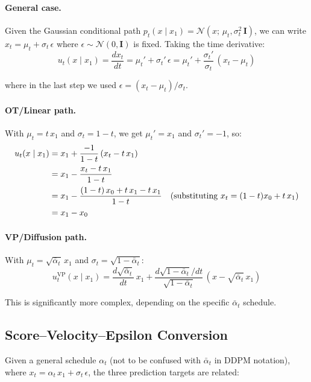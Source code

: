 \documentclass[11pt, a4paper]{article}
\newcommand{\alphabar}{\bar{\alpha}}
\newcommand{\N}{\mathcal{N}}
\newcommand{\Id}{\mathbf{I}}
\begin{document}
\paragraph{General case.}  Given the Gaussian conditional path
$p_t(x \mid x_1) = \N(x;\, \mu_t, \sigma_t^2\, \Id)$, we can write
$x_t = \mu_t + \sigma_t\, \epsilon$ where $\epsilon \sim \N(0,\Id)$ is
fixed.  Taking the time derivative:
\begin{equation}
  u_t(x \mid x_1) = \frac{dx_t}{dt}
  = \mu_t' + \sigma_t'\, \epsilon
  = \mu_t' + \frac{\sigma_t'}{\sigma_t}\,(x_t - \mu_t)
\end{equation}

where in the last step we used $\epsilon = (x_t - \mu_t)/\sigma_t$.

\paragraph{OT/Linear path.}
With $\mu_t = t\,x_1$ and $\sigma_t = 1-t$, we get
$\mu_t' = x_1$ and $\sigma_t' = -1$, so:
\begin{align}
  u_t(x \mid x_1)
  &= x_1 + \frac{-1}{1-t}\,(x_t - t\, x_1) \notag \\
  &= x_1 - \frac{x_t - t\, x_1}{1-t} \notag \\
  &= x_1 - \frac{(1-t)\,x_0 + t\,x_1 - t\,x_1}{1-t}
    \quad \text{(substituting $x_t = (1-t)x_0 + t\,x_1$)} \notag \\
  &= x_1 - x_0
\end{align}

\paragraph{VP/Diffusion path.}
With $\mu_t = \sqrt{\alphabar_t}\, x_1$ and
$\sigma_t = \sqrt{1-\alphabar_t}$:
\begin{equation}
  u_t^{\mathrm{VP}}(x \mid x_1)
  = \frac{d\sqrt{\alphabar_t}}{dt}\, x_1
  + \frac{d\sqrt{1-\alphabar_t}/dt}{\sqrt{1-\alphabar_t}}
    \,(x - \sqrt{\alphabar_t}\, x_1)
\end{equation}

This is significantly more complex, depending on the specific $\alphabar_t$
schedule.

\subsection{Score--Velocity--Epsilon Conversion}

Given a general schedule $\alpha_t$ (not to be confused with $\alphabar_t$
in DDPM notation), where $x_t = \alpha_t\, x_1 + \sigma_t\, \epsilon$, the
three prediction targets are related:
\end{document}
